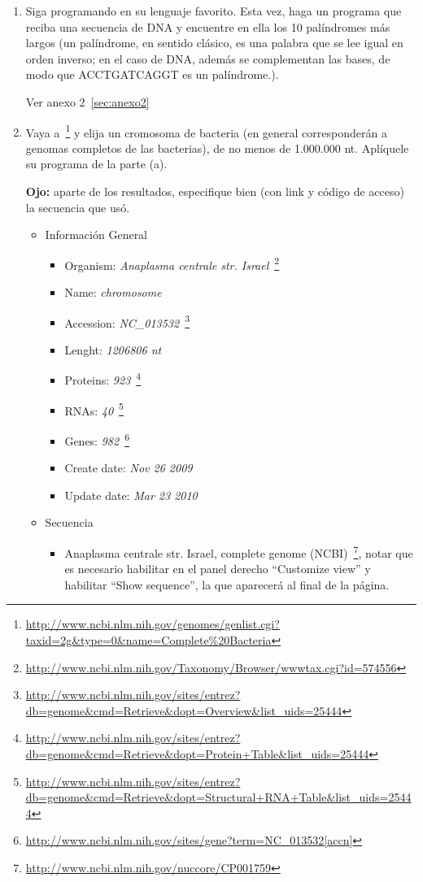 \begin{enumerate}

	\item Siga programando en su lenguaje favorito. Esta vez, haga un programa que reciba una
		secuencia de DNA y encuentre en ella los 10 palíndromes más largos (un palíndrome, en
		sentido clásico, es una palabra que se lee igual en orden inverso; en el caso de DNA, además se
		complementan las bases, de modo que ACCTGATCAGGT es un palíndrome.).

		
		Ver anexo 2~\ref{sec:anexo2}

	\item Vaya a~\footnote{\url{http://www.ncbi.nlm.nih.gov/genomes/genlist.cgi?taxid=2g\&type=0\&name=Complete\%20Bacteria}}
		y elija un cromosoma de bacteria (en general corresponderán a genomas completos de las bacterias),
		de no menos de 1.000.000 nt. Aplíquele su programa de la parte (a).

		\textbf{Ojo:} aparte de los resultados, especifique bien (con link y código de acceso) la secuencia que usó.

		\begin{itemize}
			\item Información General
				\begin{itemize}
					\item Organism: \emph{Anaplasma centrale str. Israel}~\footnote{\url{http://www.ncbi.nlm.nih.gov/Taxonomy/Browser/wwwtax.cgi?id=574556}}
					\item Name: \emph{chromosome}
					\item Accession: \emph{NC\_013532}~\footnote{\url{http://www.ncbi.nlm.nih.gov/sites/entrez?db=genome&cmd=Retrieve&dopt=Overview&list_uids=25444}}
					\item Lenght: \emph{1206806 nt}
					\item Proteins:	\emph{923}~\footnote{\url{http://www.ncbi.nlm.nih.gov/sites/entrez?db=genome&cmd=Retrieve&dopt=Protein+Table&list_uids=25444}}
					\item RNAs: \emph{40}~\footnote{\url{http://www.ncbi.nlm.nih.gov/sites/entrez?db=genome&cmd=Retrieve&dopt=Structural+RNA+Table&list_uids=25444}}
					\item Genes: \emph{982}~\footnote{\url{http://www.ncbi.nlm.nih.gov/sites/gene?term=NC_013532[accn]}}
					\item Create date: \emph{Nov 26 2009}
					\item Update date: \emph{Mar 23 2010}
				\end{itemize}
			\item Secuencia
				\begin{itemize}
					\item Anaplasma centrale str. Israel, complete genome (NCBI)~\footnote{\url{http://www.ncbi.nlm.nih.gov/nuccore/CP001759}},
						notar que es necesario habilitar en el panel derecho ``Customize view'' y habilitar ``Show sequence'',
						la que aparecerá al final de la página.\\


\end{itemize}
\end{itemize}
\end{enumerate}
